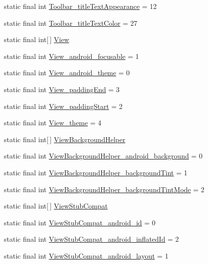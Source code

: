 \begin{CompactItemize}
\item 
static final int \hyperlink{classandroid_1_1support_1_1v4_1_1_r_1_1styleable_bced41bbc6326ea8b574802f6d167432}{Toolbar\_\-titleTextAppearance} = 12
\item 
static final int \hyperlink{classandroid_1_1support_1_1v4_1_1_r_1_1styleable_16f85315e8a126339f05a6869996771b}{Toolbar\_\-titleTextColor} = 27
\item 
static final int\mbox{[}$\,$\mbox{]} \hyperlink{classandroid_1_1support_1_1v4_1_1_r_1_1styleable_b4963d78f1fa8984188692ee48ea20d2}{View}
\item 
static final int \hyperlink{classandroid_1_1support_1_1v4_1_1_r_1_1styleable_aee6d63750b2dba7fdc9fbb4e30b5406}{View\_\-android\_\-focusable} = 1
\item 
static final int \hyperlink{classandroid_1_1support_1_1v4_1_1_r_1_1styleable_26f4118fb592f19ebed8ecd1a890f65e}{View\_\-android\_\-theme} = 0
\item 
static final int \hyperlink{classandroid_1_1support_1_1v4_1_1_r_1_1styleable_d641d27f14bbb0e085ee8f2086bfe3ee}{View\_\-paddingEnd} = 3
\item 
static final int \hyperlink{classandroid_1_1support_1_1v4_1_1_r_1_1styleable_7f4d8c133f2bc4da71daa16cdc57307b}{View\_\-paddingStart} = 2
\item 
static final int \hyperlink{classandroid_1_1support_1_1v4_1_1_r_1_1styleable_476575738874837ba5b44a1c9cedb790}{View\_\-theme} = 4
\item 
static final int\mbox{[}$\,$\mbox{]} \hyperlink{classandroid_1_1support_1_1v4_1_1_r_1_1styleable_d2471e02511d7025f7168272065a760a}{ViewBackgroundHelper}
\item 
static final int \hyperlink{classandroid_1_1support_1_1v4_1_1_r_1_1styleable_d1d939ab4db138508ef554b91d462b56}{ViewBackgroundHelper\_\-android\_\-background} = 0
\item 
static final int \hyperlink{classandroid_1_1support_1_1v4_1_1_r_1_1styleable_2909631ff949ac1d62e73fab3d3f3657}{ViewBackgroundHelper\_\-backgroundTint} = 1
\item 
static final int \hyperlink{classandroid_1_1support_1_1v4_1_1_r_1_1styleable_ce8b167b299fb0cf05509b92a60b8d04}{ViewBackgroundHelper\_\-backgroundTintMode} = 2
\item 
static final int\mbox{[}$\,$\mbox{]} \hyperlink{classandroid_1_1support_1_1v4_1_1_r_1_1styleable_2b14c683a11161f4740b13eb80af9370}{ViewStubCompat}
\item 
static final int \hyperlink{classandroid_1_1support_1_1v4_1_1_r_1_1styleable_38d2168866d2e90ab7678e5f08617eba}{ViewStubCompat\_\-android\_\-id} = 0
\item 
static final int \hyperlink{classandroid_1_1support_1_1v4_1_1_r_1_1styleable_fbb85415ec2416f8cfc401e1532b49ae}{ViewStubCompat\_\-android\_\-inflatedId} = 2
\item 
static final int \hyperlink{classandroid_1_1support_1_1v4_1_1_r_1_1styleable_e4052db577a557ecc97dc5c3f81aabd7}{ViewStubCompat\_\-android\_\-layout} = 1
\end{CompactItemize}


